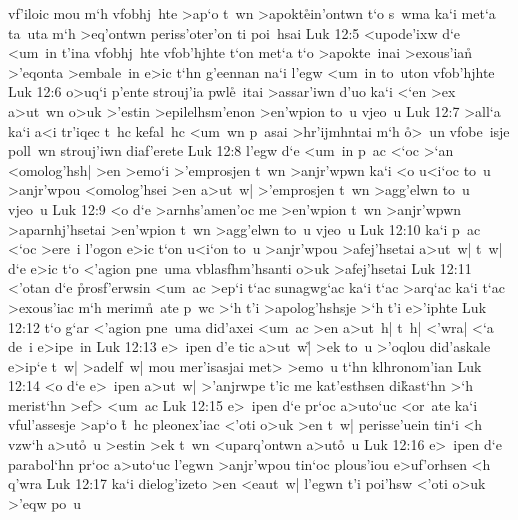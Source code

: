 vf'iloic
mou
m`h
vfobhj~hte
>ap`o
t~wn
>apokt\r{e}in'ontwn
t`o
s~wma
ka`i
met`a
ta~uta
m`h
>eq'ontwn
periss'oter'on
ti
poi~hsai\bibvsend
\vs Luk 12:5
<upode'ixw
d`e
<um~in
t'ina
vfobhj~hte
vfob'hjhte
t`on
met`a
t`o
>apokte~inai
>exous'ian\r{}
>'eqonta
>embale~in
e>ic
t`hn
g'eennan
na`i
l'egw
<um~in
to~uton
vfob'hjhte\bibvsend
\vs Luk 12:6
o>uq`i
p'ente
strouj'ia
pwl\r{e}~itai
>assar'iwn
d'uo
ka`i
<`en
>ex
a>ut~wn
o>uk
>'estin
>epilelhsm'enon
>en'wpion
to~u
vjeo~u\bibvsend
\vs Luk 12:7
>all`a
ka`i
a<i
tr'iqec
t~hc
kefal~hc
<um~wn
p~asai
>hr'ijmhntai
m`h
\r{o}>~un
vfobe~isje
poll~wn
strouj'iwn
diaf'erete\bibvsend
\vs Luk 12:8
l'egw
d`e
<um~in
p~ac
<`oc
>`an
<omolog'hsh|
>en
>emo`i
>'emprosjen
t~wn
>anjr'wpwn
ka`i
<o
u<i`oc
to~u
>anjr'wpou
<omolog'hsei
>en
a>ut~w|
>'emprosjen
t~wn
>agg'elwn
to~u
vjeo~u\bibvsend
\vs Luk 12:9
<o
d`e
>arnhs'amen'oc
me
>en'wpion
t~wn
>anjr'wpwn
>aparnhj'hsetai
>en'wpion
t~wn
>agg'elwn
to~u
vjeo~u\bibvsend
\vs Luk 12:10
ka`i
p~ac
<`oc
>ere~i
l'ogon
e>ic
t`on
u<i`on
to~u
>anjr'wpou
>afej'hsetai
a>ut~w|
t~w|
d`e
e>ic
t`o
<'agion
pne~uma
vblasfhm'hsanti
o>uk
>afej'hsetai\bibvsend
\vs Luk 12:11
<'otan
d`e
\r{p}rosf'erwsin
<um~ac
>ep`i
t`ac
sunagwg`ac
ka`i
t`ac
>arq`ac
ka`i
t`ac
>exous'iac
m`h
merim\r{n}~ate
p~wc
>`h
t'i
>apolog'hshsje
>`h
t'i
e>'iphte\bibvsend
\vs Luk 12:12
t`o
g`ar
<'agion
pne~uma
did'axei
<um~ac
>en
a>ut~h|
t~h|
<'wra|
<`a
de~i
e>ipe~in\bibvsend
\vs Luk 12:13
e>~ipen
d'e
tic
a>ut~w|\r{}
>ek
to~u
>'oqlou
did'askale
e>ip`e
t~w|
>adelf~w|
mou
mer'isasjai
met>
>emo~u
t`hn
klhronom'ian\bibvsend
\vs Luk 12:14
<o
d`e
e>~ipen
a>ut~w|
>'anjrwpe
t'ic
me
kat'esthsen
di\r{k}ast`hn
>`h
merist`hn
>ef>
<um~ac\bibvsend
\vs Luk 12:15
e>~ipen
d`e
pr`oc
a>uto`uc
<or~ate
ka`i
vful'assesje
>ap`o
\r{t}~hc
pleonex'iac
<'oti
o>uk
>en
t~w|
perisse'uein
tin`i
<h
vzw`h
a>ut\r{o}~u
>estin
>ek
t~wn
<uparq'ontwn
a>ut\r{o}~u\bibvsend
{}
\vs Luk 12:16
e>~ipen
d`e
parabol`hn
pr`oc
a>uto`uc
l'egwn
>anjr'wpou
tin`oc
plous'iou
e>uf'orhsen
<h
q'wra\bibvsend
\vs Luk 12:17
ka`i
dielog'izeto
>en
<eaut~w|
l'egwn
t'i
poi'hsw
<'oti
o>uk
>'eqw
po~u
